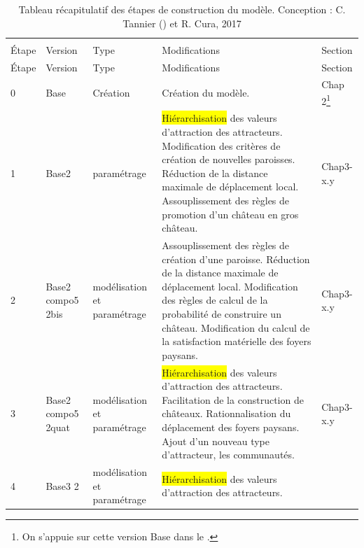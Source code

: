 \documentclass[12pt, a4paper, oneside]{book}
\begin{document}
	
	\pagebreak
	\begin{footnotesize}
		\begin{longtable}{ m{} m{}  m{}  m{}  m{}  }
			\caption{Tableau récapitulatif des étapes de construction du modèle. Conception : C. Tannier () et R. Cura, 2017}\\
			\label{table:etapes-construction}\\
			Étape & Version & Type & Modifications & Section\\
			\endfirsthead
			Étape & Version & Type & Modifications & Section\\
			\endhead			
			\hline
			0 & Base & Création & Création du modèle. \fixref{Cf. tableau 14 de Tannier 2017} & Chap 2\footnote{On s'appuie sur cette version \og Base\fg{} dans le \fixref{chapitre 2}.}\\
			\hline
			1 & Base2 & paramétrage & \colorbox{yellow}{Hiérarchisation} des valeurs d'attraction des attracteurs. \newline
			Modification des critères de création de nouvelles paroisses. \newline
			Réduction de la distance maximale de déplacement local. \newline
			Assouplissement des règles de promotion d'un château en gros château. & Chap3-x.y\\
			\hline
			2 & Base2 compo5 2bis & modélisation et paramétrage & Assouplissement des règles de création d'une paroisse.\newline
			Réduction de la distance maximale de déplacement local. \newline
			Modification des règles de calcul de la probabilité de construire un château.\newline
			Modification du calcul de la satisfaction matérielle des foyers paysans. & Chap3-x.y\\
			\hline
			3 & Base2 compo5 2quat & modélisation et paramétrage & \colorbox{yellow}{Hiérarchisation} des valeurs d'attraction des attracteurs. \newline
			Facilitation de la construction de châteaux. \newline
			Rationnalisation du déplacement des foyers paysans. \newline
			Ajout d'un nouveau type d'attracteur, les communautés. & Chap3-x.y\\
			\hline
			4 & Base3 2 & modélisation et paramétrage & \colorbox{yellow}{Hiérarchisation} des valeurs d'attraction des attracteurs. \newline

\end{longtable}
\end{footnotesize}
\end{document}
